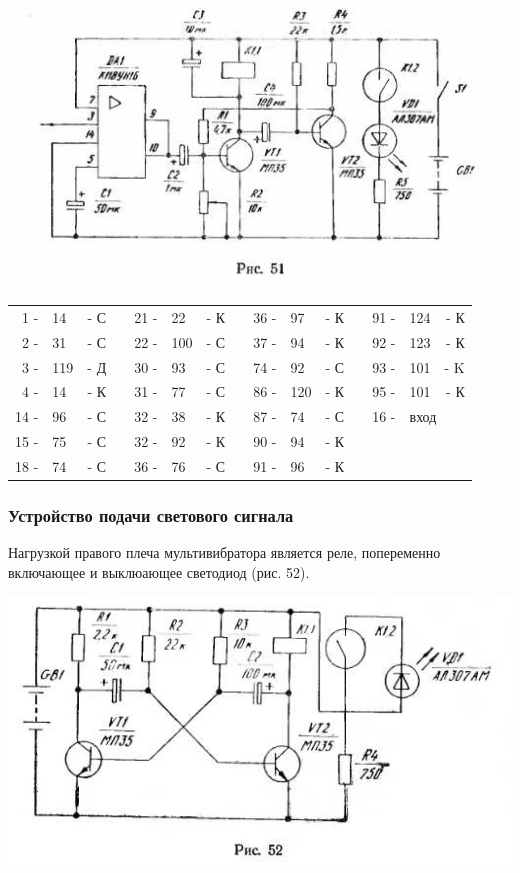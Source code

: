 \documentclass[12pt]{article}
\newcommand{\mc}{\multicolumn}
\begin{document}
\includegraphics[scale=1, angle=0]{ekon3_051_1}

\hrulefill

\begin{tabular}{r l r p{0.5cm} r l r p{0.5cm} r l r p{0.5cm} r l r}
 1 - &  14 & - С &   & 21 - & 22 & - К &   & 36 - &  97 & - К &   &  91 - & 124  & - К\\
 2 - &  31 & - С &   & 22 - &100 & - С &   & 37 - &  94 & - К &   &  92 - & 123  & - К\\
 3 - & 119 & - Д &   & 30 - & 93 & - С &   & 74 - &  92 & - С &   &  93 - & 101  & - K\\
 4 - &  14 & - К &   & 31 - & 77 & - С &   & 86 - & 120 & - К &   &  95 - & 101  & - К\\
14 - &  96 & - С &   & 32 - & 38 & - К &   & 87 - &  74 & - С &   &  16 - & \mc{2}{l}{вход} \\
15 - &  75 & - С &   & 32 - & 92 & - К &   & 90 - &  94 & - К &   &       &      &    \\
18 - &  74 & - С &   & 36 - & 76 & - С &   & 91 - &  96 & - К &   &       &      &    \\
\end{tabular}

\hrulefill

\newpage

\subsubsection{Устройство подачи светового сигнала}

Нагрузкой правого плеча мультивибратора является реле, попеременно включающее и выклюающее светодиод (рис. 52).

\includegraphics[scale=1, angle=1]{ekon3_052_1}
\end{document}
